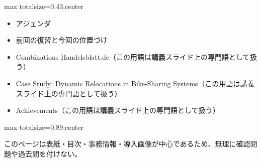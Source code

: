 \clearpage
{}
\begin{minipage}[t]{0.405\textwidth}
\begin{adjustbox}{max totalsize={\textwidth}{0.43\textheight},center}
\begin{minipage}{\textwidth}\scriptsize
{}\begin{itemize}
\item アジェンダ
\item 前回の復習と今回の位置づけ
\item Combinations Handelsblatt.de（この用語は講義スライド上の専門語として扱う）
\item Case Study: Dynamic Relocations in Bike-Sharing Systems（この用語は講義スライド上の専門語として扱う）
\item Achievements（この用語は講義スライド上の専門語として扱う）
\end{itemize}
\end{minipage}
\end{adjustbox}
\end{minipage}\hfill
\begin{minipage}[t]{0.58\textwidth}
\begin{adjustbox}{max totalsize={\textwidth}{0.89\textheight},center}
\begin{minipage}{\textwidth}\scriptsize
{}このページは表紙・目次・事務情報・導入画像が中心であるため、無理に確認問題や過去問を付けない。
\end{minipage}
\end{adjustbox}
\end{minipage}


